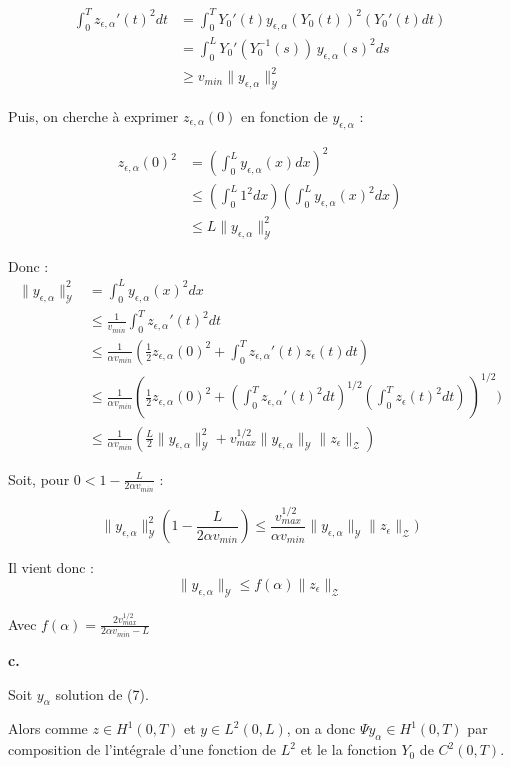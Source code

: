 \documentclass[a4paper]{article}
\newcommand{\Y}{\mathscr{Y}}
\newcommand{\Z}{\mathscr{Z}}
\newcommand{\yea}{y_{\epsilon, \alpha}}
\newcommand{\zea}{z_{\epsilon, \alpha}}
\begin{document}
\[
\begin{split}
\int_0^T \zea'(t)^2 dt & = \int_0^T Y_0'(t)\yea(Y_0(t))^2 (Y_0'(t)dt) \\
                       & = \int_0^L Y_0'(Y_0^{-1}(s)) \, \yea(s)^2 ds\\
					   & \geq v_{min} \| \yea \|_{\Y}^2
\end{split}
\]

Puis, on cherche à exprimer $\zea(0)$ en fonction de $\yea$ :

\[
\begin{split}
	\zea(0)^2 &= (\int_0^L \yea(x)dx)^2 \\
	          & \leq (\int_0^L 1^2dx)(\int_0^L \yea(x)^2 dx) \\
			  & \leq L \| \yea \|_{\Y}^2
\end{split}
\]

Donc :
\[
\begin{split}
\| \yea \|_{\Y}^2 &= \int_0^L \yea(x)^2 dx \\
                  &\leq \displaystyle \frac{1}{v_{min}}
				      \int_0^T \zea'(t)^2 dt \\ 
				  &\leq \displaystyle \frac{1}{\alpha v_{min}}
				      (\displaystyle \frac{1}{2}\zea(0)^2 
				      + \int_0^T \zea'(t)z_{\epsilon}(t) dt)\\
					  &\leq \displaystyle \frac{1}{\alpha v_{min}}
					      (\displaystyle \frac{1}{2}\zea(0)^2 
					      + (\int_0^T \zea'(t)^2 dt)^{1/2}
						   (\int_0^Tz_{\epsilon}(t)^2 dt)\,)^{1/2})\\
				  &\leq \displaystyle \frac{1}{\alpha v_{min}}
				      (\frac{L}{2}  \| \yea \|_{\Y}^2
				      +  v_{max}^{1/2} \| \yea \|_{\Y}
					  \|z_{\epsilon} \|_{\Z})
\end{split}
\]

Soit, pour $0< 1-\displaystyle \frac{L}{2\alpha v_{min}} $  :

\[
\| \yea \|_{\Y}^2 (1-\displaystyle \frac{L}{2\alpha v_{min}})
  \leq \frac{v_{max}^{1/2}}{\alpha v_{min}}  \| \yea \|_{\Y} \|z_{\epsilon} \|_{\Z})
\]				  

Il vient donc :
\[
\| \yea \|_{\Y}  \leq f(\alpha) \|z_{\epsilon} \|_{\Z}
\]

Avec $f(\alpha) = \displaystyle \frac{2v_{max}^{1/2}}{2\alpha v_{min} -L}$

\vspace{0.3cm}
\textbf{c.}

Soit $y_{\alpha}$ solution de (7).

Alors comme $z\in H^1(0,T)$ et $y\in L^2(0,L)$, 
on a donc $\Psi y_{\alpha} \in H^1(0,T)$ par composition de l'intégrale d'une fonction de $L^2$
et le la fonction $Y_0$ de $C^2(0,T)$.
\end{document}
